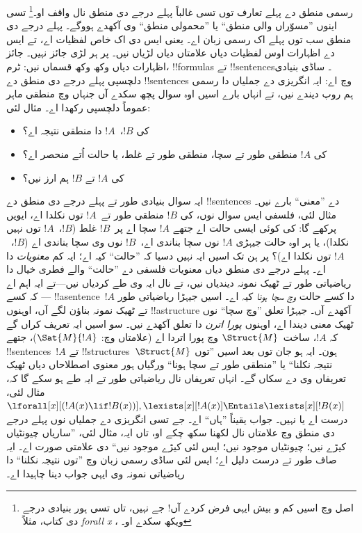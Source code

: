 \documentclass[../../../include/open-logic-section]{subfiles}
\begin{document}


رسمی منطق دے پہلے تعارف توں تسی غالباً پہلے درجے
دی منطق نال واقف او۔\footnote{اصل وچ اسیں کم و بیش
ایہی فرض کردے آں!{} جے نہیں، تاں تسی ہور بنیادی
درجے دی کتاب، مثلاً \emph{forall x}
\citep{Magnus2021}، ویکھ سکدے او۔}
تسی اینوں ”مسوّراں والی منطق“ یا ”محمولی منطق“
وی آکھدے ہووگے۔ پہلے درجے دی منطق سب توں پہلے
اک رسمی زبان اے۔ یعنی ایس دی اک خاص لفظیات اے،
تے ایس دے اظہارات اوس لفظیات دیاں علامتاں دیاں
لڑیاں نیں۔ پر ہر لڑی جائز نہیں۔ جائز اظہارات
دیاں وکھ وکھ قسماں نیں: ٹرم، !!{formula}s تے
!!{sentence}s۔ ساڈی بنیادی دلچسپی پہلے درجے
دی منطق دے !!{sentence}s وچ اے: ایہ انگریزی
دے جملیاں دا رسمی ہم روپ دیندے نیں، تے انہاں
بارے اسیں اوہ سوال پچھ سکدے آں جنہاں وچ منطقی
ماہر عموماً دلچسپی رکھدا اے۔ مثال لئی:
\begin{itemize}
    \item کی $!B$،~$!A$ دا منطقی نتیجہ اے؟
    \item کی $!A$ منطقی طور تے سچا، منطقی طور تے
غلط، یا حالت اُتے منحصر اے؟
    \item کی $!A$ تے $!B$ ہم ارز نیں؟
\end{itemize}

ایہ سوال بنیادی طور تے پہلے درجے دی منطق دے
!!{sentence}s دے ”معنی“ بارے نیں۔ مثال لئی،
فلسفی ایس سوال نوں، کی $!B$ منطقی طور تے~$!A$
توں نکلدا اے، ایویں پرکھے گا: کی کوئی ایسی حالت
اے جتھے $!A$ سچا اے پر~$!B$ غلط
($!B$،~$!A$ توں نہیں نکلدا)، یا ہر اوہ حالت
جیہڑی $!A$ نوں سچا بناندی اے،~$!B$ نوں وی
سچا بناندی اے ($!B$،~$!A$ توں نکلدا اے)؟
پر ہن تک اسیں ایہ نہیں دسیا کہ ”حالت“ کیہ اے؛
ایہ کم \emph{معنویات} دا اے۔ پہلے درجے دی منطق
دیاں معنویات فلسفی دے ”حالت“ والے فطری خیال
دا ریاضیاتی طور تے ٹھیک نمونہ دیندیاں نیں،
تے نال ایہ وی طے کردیاں نیں---تے ایہ اہم اے---
کہ کسے !!a{sentence}~$!A$ دا کسے حالت
\emph{وچ سچا ہونا} کیہ اے۔ اسیں جیہڑا
ریاضیاتی طور تے ٹھیک نمونہ بناؤن لگے آں، اوہنوں
!!a{structure} آکھدے آں۔ جیہڑا تعلق
”وچ سچا“ نوں ٹھیک معنی دیندا اے، اوہنوں
\emph{پورا اترن} دا تعلق آکھدے نیں۔ سو اسیں
ایہ تعریف کراں گے کہ $!A$،
ساخت~$\Struct{M}$ وچ پورا اتردا اے
(علامتاں وچ: $\Sat{M}{!A}$)،
جتھے !!{sentence}s~$!A$ تے
!!{structure}s~$\Struct{M}$ ہون۔
ایہ ہو جان توں بعد اسیں ”توں نتیجہ نکلنا“
یا ”منطقی طور تے سچا ہونا“ ورگیاں ہور
معنوی اصطلاحاں دیاں ٹھیک تعریفاں وی دے سکاں
گے۔ انہاں تعریفاں نال ریاضیاتی طور تے
ایہ طے ہو سکے گا کہ، مثال لئی،
$\lforall[x][(!A(x) \lif !B(x))],
\lexists[x][!A(x)] \Entails \lexists[x][!B(x)]$
درست اے یا نہیں۔ جواب یقیناً ”ہاں“ اے۔
جے تسی انگریزی دے جملیاں نوں پہلے درجے
دی منطق وچ علامتاں نال لکھنا سکھ چکے او،
تاں ایہ، مثال لئی، ”ساریاں چیونٹیاں کیڑے
نیں؛ چیونٹیاں موجود نیں؛ ایس لئی کیڑے موجود
نیں“ دی علامتی صورت اے۔ ایہ صاف طور تے
درست دلیل اے؛ ایس لئی ساڈی رسمی زبان
وچ ”توں نتیجہ نکلنا“ دا ریاضیاتی نمونہ
وی ایہی جواب دینا چاہیدا اے۔
\end{document}
